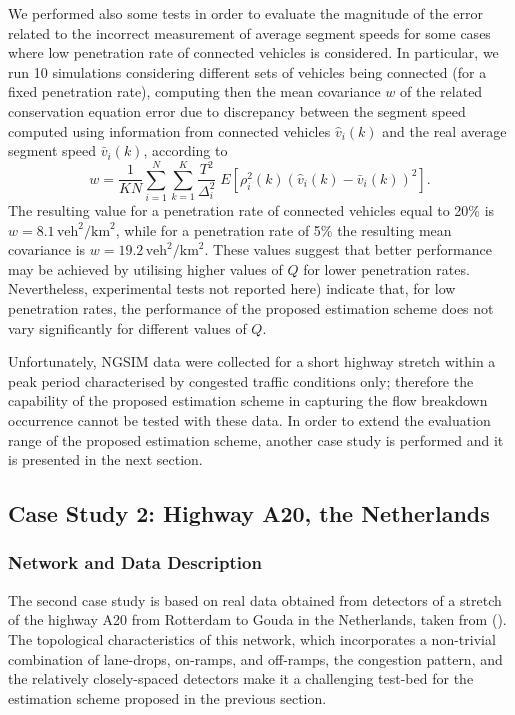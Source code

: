 \documentclass[titlepage,oneside,fleqn,12pt]{article}
\newcommand{\trbnum}[1]{{\it \citenum{#1}}}
\begin{document}
We performed also some tests in order to evaluate the magnitude of the error related to the incorrect measurement of average segment speeds for some cases where low penetration rate of connected vehicles is considered. In particular, we run 10 simulations considering different sets of vehicles being connected (for a fixed penetration rate), computing then the mean covariance $w$ of the related conservation equation error due to discrepancy between the segment speed computed using information from connected vehicles $\hat{v}_i(k)$ and the real average segment speed $\bar{v}_i(k)$, according to
\begin{equation} \label{covar}
w = \frac{1}{KN} \sum_{i=1}^N \sum_{k=1}^K \frac{T^2}{\Delta_i^2} \; E \left[ \rho_i^2(k) \left( \hat{v}_i(k) - \bar{v}_i(k) \right)^2 \right] .
\end{equation}
The resulting value for a penetration rate of connected vehicles equal to 20\% is $w=8.1\,\mbox{veh}^2/\mbox{km}^2$, while for a penetration rate of 5\% the resulting mean covariance is $w=19.2\,\mbox{veh}^2/\mbox{km}^2$. These values suggest that better performance may be achieved by utilising higher values of $Q$ for lower penetration rates. Nevertheless, experimental tests not reported here) indicate that, for low penetration rates, the performance of the proposed estimation scheme does not vary significantly for different values of $Q$.

Unfortunately, NGSIM data were collected for a short highway stretch within a peak period characterised by congested traffic conditions only; therefore the capability of the proposed estimation scheme in capturing the flow breakdown occurrence cannot be tested with these data. In order to extend the evaluation range of the proposed estimation scheme, another case study is performed and it is presented in the next section.

\subsection{Case Study 2: Highway A20, the Netherlands}

\subsubsection{Network and Data Description}

The second case study is based on real data obtained from detectors of a stretch of the highway A20 from Rotterdam to Gouda in the Netherlands, taken from (\trbnum{Schakel2014}). The topological characteristics of this network, which incorporates a non-trivial combination of lane-drops, on-ramps, and off-ramps, the congestion pattern, and the relatively closely-spaced detectors make it a challenging test-bed for the estimation scheme proposed in the previous section.
\end{document}
